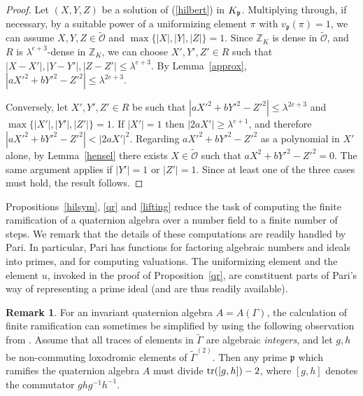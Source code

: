 \documentclass[a4paper]{amsart}
\def\Z{{\mathbb Z}}
\def\cal{\mathcal}
\def\O{{\cal O}}
\def\Otil{\tilde{\O}}
\def\Xp{{X'}}
\def\Yp{{Y'}}
\def\Zp{{Z'}}
\def\tr{\mbox{\rm tr}}
\def\Gammatil{\tilde{\Gamma}}
\def\p{{\mathfrak p}}
\theoremstyle{definition}
\newtheorem{remark}[theorem]{Remark}
\begin{document}
\begin{proof}
Let $(X,Y,Z)$ be a solution of (\ref{hilbert}) in $\Kp$. Multiplying
through, if necessary, by a suitable power of a uniformizing element
$\pi$ with $v_{\p}(\pi) = 1$, 
we can assume
$X,Y,Z \in \Otil$ and $\max\{|X|,|Y|,|Z|\} = 1$. Since $\Z_K$ is dense
in $\Otil$, and $R$ is $\lambda^{e+3}$-dense in $\Z_K$, we can choose $\Xp,\Yp,\Zp
\in R$ such that $|X - \Xp|,|Y - \Yp|,|Z - \Zp| \leq \lambda^{e+3}$. By
Lemma~\ref{approx}, $|a\Xp^2 + b\Yp^2 - \Zp^2| \leq \lambda^{2e+3}$. 

Conversely, let $\Xp,\Yp,\Zp \in R$ be such that $|a\Xp^2 + b\Yp^2 - \Zp^2|
\leq \lambda^{2e+3}$ and $\max\{|\Xp|,|\Yp|,|\Zp|\} = 1$. If $|\Xp| = 1$ then
$|2a\Xp| \geq \lambda^{e+1}$, and therefore $|a\Xp^2 + b\Yp^2 - \Zp^2| <
|2a\Xp|^2$. Regarding $a\Xp^2 + b\Yp^2 - \Zp^2$ as a polynomial in $\Xp$
alone, by Lemma~\ref{hensel} there exists $X\in\Otil$ such that $aX^2 +
b\Yp^2 - \Zp^2 = 0$. The same argument applies if $|\Yp| = 1$ or $|\Zp| =
1$. Since at least one of the three cases must hold, the result follows. 
\end{proof}

Propositions~\ref{hilsym}, \ref{qr} and \ref{lifting} reduce the
task of computing the finite ramification of a quaternion algebra over
a number field to a finite number of steps. We remark that the details
of these computations are readily handled by Pari. In particular,
Pari has functions for factoring algebraic numbers and ideals into
primes, and for computing valuations. The uniformizing element and the
element $u$, invoked in the proof of Proposition~\ref{qr}, are
constituent parts of Pari's way of representing a prime ideal (and
are thus readily available).

\begin{remark}
For an invariant quaternion algebra $A = A(\Gamma)$,
the calculation of finite ramification
can sometimes be simplified by using the following observation from
\cite{gmmr}. Assume that all traces of elements in $\Gammatil$ 
are algebraic {\em integers}, and  
let $g,h$ be non-commuting loxodromic elements of $\Gammatil^{(2)}$.
Then any prime $\p$ which ramifies the quaternion algebra $A$ must 
divide $\tr([g,h]) - 2$, where $[g,h]$ denotes the commutator $ghg^{-1}h^{-1}$. 
\end{remark}
\end{document}
